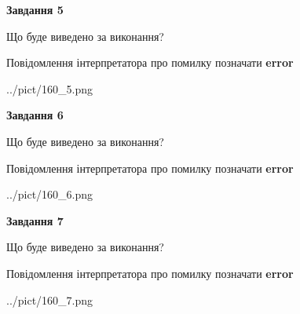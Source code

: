 \documentclass[10pt, ukrainian]{article}
\begin{document}
{\begin {large}
{\begin {center}\textbf{Завдання 5}\end {center}}\par
Що буде виведено за виконання? \par
Повідомлення інтерпретатора про помилку позначати \textbf{error}

\begin{center}
	{../pict/160_5.png}
\end{center}
\newpage

{\begin {center}\textbf{Завдання 6}\end {center}}\par
Що буде виведено за виконання? \par
Повідомлення інтерпретатора про помилку позначати \textbf{error}

\begin{center}
	{../pict/160_6.png}
\end{center}
\newpage

{\begin {center}\textbf{Завдання 7}\end {center}}\par
Що буде виведено за виконання? \par
Повідомлення інтерпретатора про помилку позначати \textbf{error}

\begin{center}
	{../pict/160_7.png}
\end{center}
\newpage

\end {large}}
\end{document}
